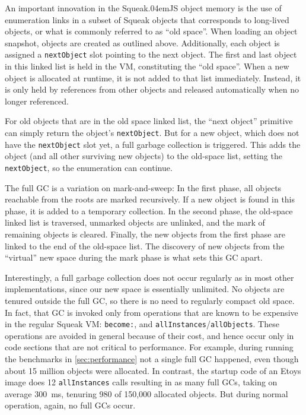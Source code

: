 \documentclass[natbib]{sigplanconf}
\newcommand*\SqueakJS{Squeak\texorpdfstring{\kern.04em}{}JS\xspace}
\begin{document}
An important innovation in the \SqueakJS object memory is the use of
enumeration links in a subset of Squeak objects that corresponds to
long-lived objects, or what is commonly referred to as ``old space''.
When loading an object snapshot, objects are created as outlined
above.  Additionally, each object is assigned a \lstinline|nextObject|
slot pointing to the next object. The first and last object in this
linked list is held in the VM, constituting the ``old space''. When a
new object is allocated at runtime, it is not added to that list
immediately. Instead, it is only held by references from other objects
and released automatically when no longer referenced.

For old objects that are in the old space linked list, the ``next
object'' primitive can simply return the object's
\lstinline|nextObject|. But for a new object, which does not have the
\lstinline|nextObject| slot yet, a full garbage collection is
triggered. This adds the object (and all other surviving new objects)
to the old-space list, setting the \lstinline|nextObject|, so the
enumeration can continue.

The full \ac{GC} is a variation on mark-and-sweep: In the first phase,
all objects reachable from the roots are marked recursively. If a new
object is found in this phase, it is added to a temporary collection.
In the second phase, the old-space linked list is traversed, unmarked
objects are unlinked, and the mark of remaining objects is cleared.
Finally, the new objects from the first phase are linked to the end of
the old-space list. The discovery of new objects from the ``virtual''
new space during the mark phase is what sets this \ac{GC} apart.

Interestingly, a full garbage collection does not occur regularly as
in most other implementations, since our new space is essentially
unlimited. No objects are tenured outside the full \ac{GC}, so there
is no need to regularly compact old space. In fact, that \ac{GC} is
invoked only from operations that are known to be expensive in the
regular Squeak \ac{VM}: \lstinline|become:|, and
\lstinline|allInstances|\thinspace{}/\thinspace{}\lstinline|allObjects|.
These operations are avoided in general because of their cost, and
hence occur only in code sections that are not critical to
performance. For example, during running the benchmarks in
\autoref{sec:performance} not a single full \ac{GC} happened, even though
about 15 million objects were allocated. In contrast, the startup code
of an Etoys image does 12 \lstinline|allInstances| calls resulting in
as many full \acp{GC}, taking on average \SI{300}{\ms}, tenuring 980 of
150,000 allocated objects. But during normal operation, again, no full
\acp{GC} occur.
\end{document}
